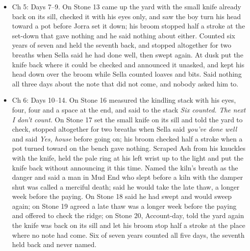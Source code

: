 \documentclass{design/chronicle}
\begin{document}
{\begin{itemize}[leftmargin=1.4em,itemsep=1pt,topsep=3pt,parsep=0pt]
\end{itemize}

\begin{itemize}[leftmargin=1.4em,itemsep=1pt,topsep=3pt,parsep=0pt]

\item Ch 5: Days 7--9. On Stone 13 came up the yard with the small knife already back on its sill, checked it with his eyes only, and saw the boy turn his head toward a pot before Jorra set it down; his broom stopped half a stroke at the set-down that gave nothing and he said nothing about either. Counted six years of seven and held the seventh back, and stopped altogether for two breaths when Sella said he had done well, then swept again. At dusk put the knife back where it could be checked and announced it unasked, and kept his head down over the broom while Sella counted loaves and bits. Said nothing all three days about the note that did not come, and nobody asked him to.

\end{itemize}

\begin{itemize}[leftmargin=1.4em,itemsep=1pt,topsep=3pt,parsep=0pt]

\item Ch 6: Days 10--14. On Stone 16 measured the kindling stack with his eyes, four, four and a space at the end, and said to the stack \emph{Six counted. The next I don’t count.} On Stone 17 set the small knife on its sill and told the yard to check, stopped altogether for two breaths when Sella said \emph{you’ve done well} and said \emph{Yes, house} before going on; his broom checked half a stroke when a pot turned toward on the bench gave nothing. Scraped Ash from his knuckles with the knife, held the pale ring at his left wrist up to the light and put the knife back without announcing it this time. Named the kiln’s breath as the danger and said a man in Mud End who slept before a kiln with the damper shut was called a merciful death; said he would take the late thaw, a longer week before the paying. On Stone 18 said he had swept and would sweep again; on Stone 19 agreed a late thaw was a longer week before the paying and offered to check the ridge; on Stone 20, Account-day, told the yard again the knife was back on its sill and let his broom stop half a stroke at the place where no note had come. Six of seven years counted all five days, the seventh held back and never named.

\end{itemize}

}
\end{document}
